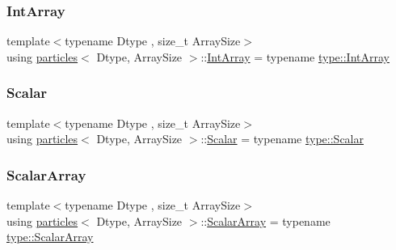 \mbox{\label{classparticles_a1b766bf5ccced2005beaacbb07e46bf9}} 
\subsubsection{\texorpdfstring{Int\+Array}{IntArray}}
{\footnotesize\ttfamily template$<$typename Dtype , size\+\_\+t Array\+Size$>$ \\
using \mbox{\hyperlink{classparticles}{particles}}$<$ Dtype, Array\+Size $>$\+::\mbox{\hyperlink{classparticles_a1b766bf5ccced2005beaacbb07e46bf9}{Int\+Array}} =  typename \mbox{\hyperlink{struct_space_h_1_1_proto_type_ad9105b93d029a9d231bc31ddcfd7dbd9}{type\+::\+Int\+Array}}}

\mbox{\label{classparticles_a57a6b6582045a4b20742b99c513e9f63}} 
\subsubsection{\texorpdfstring{Scalar}{Scalar}}
{\footnotesize\ttfamily template$<$typename Dtype , size\+\_\+t Array\+Size$>$ \\
using \mbox{\hyperlink{classparticles}{particles}}$<$ Dtype, Array\+Size $>$\+::\mbox{\hyperlink{classparticles_a57a6b6582045a4b20742b99c513e9f63}{Scalar}} =  typename \mbox{\hyperlink{struct_space_h_1_1_proto_type_af3c8245d83d9db64749882920de5c274}{type\+::\+Scalar}}}

\mbox{\label{classparticles_ac88daa0d493d17c5ca2fe3a1d3fe4779}} 
\subsubsection{\texorpdfstring{Scalar\+Array}{ScalarArray}}
{\footnotesize\ttfamily template$<$typename Dtype , size\+\_\+t Array\+Size$>$ \\
using \mbox{\hyperlink{classparticles}{particles}}$<$ Dtype, Array\+Size $>$\+::\mbox{\hyperlink{classparticles_ac88daa0d493d17c5ca2fe3a1d3fe4779}{Scalar\+Array}} =  typename \mbox{\hyperlink{struct_space_h_1_1_proto_type_a09ef91dc8a37a044c403f5a833044725}{type\+::\+Scalar\+Array}}}

